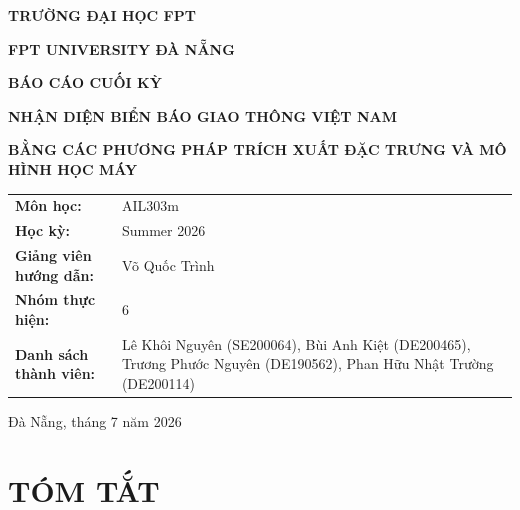 \documentclass[12pt,a4paper]{article}
\begin{document}
\begin{titlepage}
  \centering
  {\large\bfseries TRƯỜNG ĐẠI HỌC FPT\par}
  \vspace{0.25cm}
  {\large\bfseries FPT UNIVERSITY ĐÀ NẴNG\par}
  \vfill
  {\Large\bfseries BÁO CÁO CUỐI KỲ\par}
  \vspace{0.8cm}
  {\LARGE\bfseries NHẬN DIỆN BIỂN BÁO GIAO THÔNG VIỆT NAM\par}
  \vspace{0.35cm}
  {\Large\bfseries BẰNG CÁC PHƯƠNG PHÁP TRÍCH XUẤT ĐẶC TRƯNG VÀ MÔ HÌNH HỌC MÁY\par}
  \vfill
  \begin{tabular}{@{}p{}p{}@{}}
    \textbf{Môn học:} & AIL303m \\
    \textbf{Học kỳ:} & Summer 2026 \\
    \textbf{Giảng viên hướng dẫn:} & 	Võ Quốc Trình \\
    \textbf{Nhóm thực hiện:} & 6\\
    \textbf{Danh sách thành viên:} & Lê Khôi Nguyên (SE200064), 
    Bùi	Anh	Kiệt (DE200465), 
    Trương Phước Nguyên (DE190562), 
    Phan Hữu Nhật Trường (DE200114) \\
  \end{tabular}
  \vfill
  {\large Đà Nẵng, tháng 7 năm 2026\par}
\end{titlepage}

\section*{TÓM TẮT}
\end{document}
